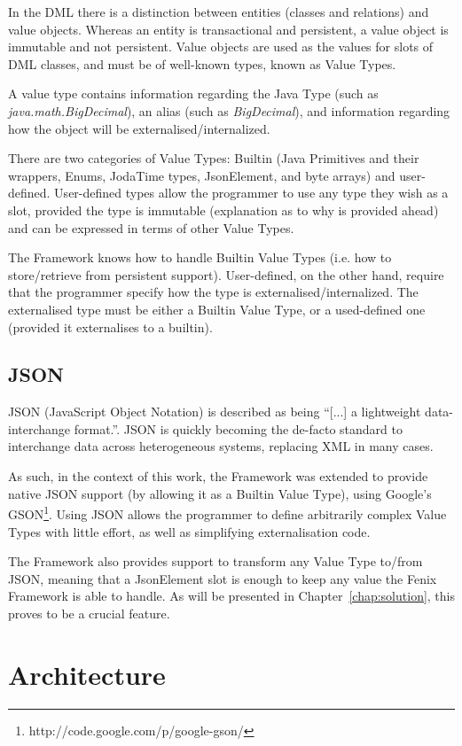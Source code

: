 In the DML there is a distinction between entities (classes and
relations) and value objects. Whereas an entity is transactional and
persistent, a value object is immutable and not persistent. Value
objects are used as the values for slots of DML classes, and must be
of well-known types, known as Value Types.

A value type contains information regarding the Java Type (such as
{\it java.math.BigDecimal}), an alias (such as {\it BigDecimal}), and information
regarding how the object will be externalised/internalized. 

There are two categories of Value Types: Builtin (Java Primitives and
their wrappers, Enums, JodaTime types, JsonElement, and byte arrays)
and user-defined. User-defined types allow the programmer to use any
type they wish as a slot, provided the type is immutable (explanation
as to why is provided ahead) and can be expressed in terms of other
Value Types.

The Framework knows how to handle Builtin Value Types (i.e. how to
store/retrieve from persistent support). User-defined, on the other
hand, require that the programmer specify how the type is
externalised/internalized. The externalised type must be either a
Builtin Value Type, or a used-defined one (provided it externalises to
a builtin).

\subsection{JSON}

JSON (JavaScript Object Notation) is described as being ``[...] a
lightweight data-interchange format.''. JSON is quickly becoming the
de-facto standard to interchange data across heterogeneous systems,
replacing XML in many cases.

As such, in the context of this work, the Framework was extended to
provide native JSON support (by allowing it as a Builtin Value Type),
using Google's GSON\footnote{http://code.google.com/p/google-gson/}.
Using JSON allows the programmer to define arbitrarily complex Value
Types with little effort, as well as simplifying externalisation code.

The Framework also provides support to transform any Value Type
to/from JSON, meaning that a JsonElement slot is enough to keep any
value the Fenix Framework is able to handle. As will be presented in
Chapter~\ref{chap:solution}, this proves to be a crucial feature.

\section{Architecture}
\label{sec:ff-arch}

